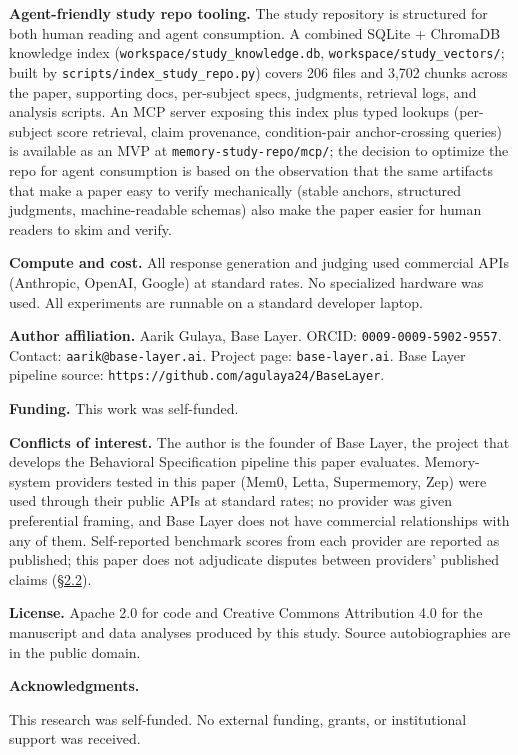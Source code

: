 \textbf{Agent-friendly study repo tooling.} The study repository is
structured for both human reading and agent consumption. A combined
SQLite + ChromaDB knowledge index
(\texttt{workspace/study\_knowledge.db},
\texttt{workspace/study\_vectors/}; built by
\texttt{scripts/index\_study\_repo.py}) covers 206 files and 3,702
chunks across the paper, supporting docs, per-subject specs, judgments,
retrieval logs, and analysis scripts. An MCP server exposing this index
plus typed lookups (per-subject score retrieval, claim provenance,
condition-pair anchor-crossing queries) is available as an MVP at
\texttt{memory-study-repo/mcp/}; the decision to optimize the repo for
agent consumption is based on the observation that the same artifacts
that make a paper easy to verify mechanically (stable anchors,
structured judgments, machine-readable schemas) also make the paper
easier for human readers to skim and verify.

\textbf{Compute and cost.} All response generation and judging used
commercial APIs (Anthropic, OpenAI, Google) at standard rates. No
specialized hardware was used. All experiments are runnable on a
standard developer laptop.

\textbf{Author affiliation.} Aarik Gulaya, Base Layer. ORCID:
\texttt{0009-0009-5902-9557}. Contact: \texttt{aarik@base-layer.ai}.
Project page: \texttt{base-layer.ai}. Base Layer pipeline source:
\texttt{https://github.com/agulaya24/BaseLayer}.

\textbf{Funding.} This work was self-funded.

\textbf{Conflicts of interest.} The author is the founder of Base Layer,
the project that develops the Behavioral Specification pipeline this
paper evaluates. Memory-system providers tested in this paper (Mem0,
Letta, Supermemory, Zep) were used through their public APIs at standard
rates; no provider was given preferential framing, and Base Layer does
not have commercial relationships with any of them. Self-reported
benchmark scores from each provider are reported as published; this
paper does not adjudicate disputes between providers' published claims
(\hyperref[memory-systems-for-llm-agents]{§2.2}).

\textbf{License.} Apache 2.0 for code and Creative Commons Attribution
4.0 for the manuscript and data analyses produced by this study. Source
autobiographies are in the public domain.

\textbf{Acknowledgments.}

This research was self-funded. No external funding, grants, or
institutional support was received.

